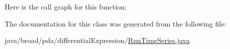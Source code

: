 Here is the call graph for this function\+:




The documentation for this class was generated from the following file\+:\begin{DoxyCompactItemize}
\item 
java/broad/pda/differential\+Expression/\hyperlink{_run_time_series_8java}{Run\+Time\+Series.\+java}\end{DoxyCompactItemize}
